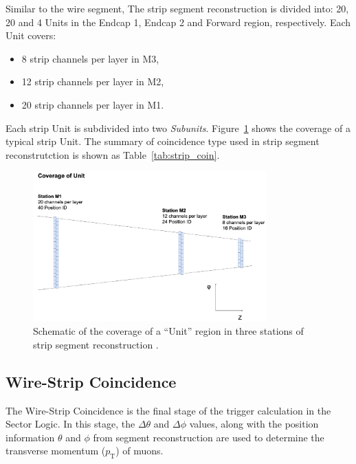 Similar to the wire segment, The strip segment reconstruction is divided into: 20, 20 and 4 Units in the Endcap 1, Endcap 2 and Forward region, respectively. Each Unit covers:
\begin{itemize}
  \item 8 strip channels per layer in M3,
  \item 12 strip channels per layer in M2,
  \item 20 strip channels per layer in M1.
\end{itemize}
Each strip Unit is subdivided into two \textit{Subunits}. Figure~\ref{fig:strip_unit} shows the coverage of a typical strip Unit. The summary of coincidence type used in strip segment reconstrutction is shown as Table~\ref{tab:strip_coin}.


\begin{figure}[htbp]
  \centering
  \includegraphics[width=0.8\textwidth]{figs/chapter5/strip_unit.png}
  \caption{Schematic of the coverage of a ``Unit'' region in three stations of strip segment reconstruction \cite{EndcapSLPDR}.}
  \label{fig:strip_unit}
\end{figure}

\subsection{Wire-Strip Coincidence} \label{subsec:WireStripCoin}
The Wire-Strip Coincidence is the final stage of the trigger calculation in the Sector Logic. In this stage, the $\Delta\theta$ and $\Delta\phi$ values, along with the position information $\theta$ and $\phi$ from segment reconstruction are used to determine the transverse momentum ($p_{\mathrm{T}}$) of muons.

